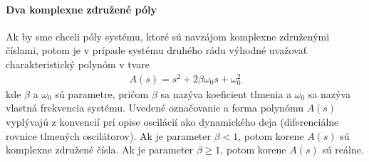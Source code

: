 \documentclass[a4paper, 10pt, ]{article}
\begin{document}
\paragraph{Dva komplexne združené póly}

Ak by sme chceli póly systému, ktoré sú navzájom komplexne združenými číslami, potom je v prípade systému druhého rádu výhodné uvažovať charakteristický polynóm v tvare
\begin{align}
    A(s) = s^2 + 2 \beta \omega_0 s + \omega_0^2
\end{align}
kde $\beta$ a $\omega_0$ sú parametre, pričom $\beta$ sa nazýva koeficient tlmenia a $\omega_0$ sa nazýva vlastná frekvencia systému. Uvedené označovanie a forma polynómu $A(s)$ vyplývajú z konvencií pri opise oscilácií ako dynamického deja (diferenciálne rovnice tlmených oscilátorov). Ak je parameter $\beta < 1$, potom korene $A(s)$ sú komplexne združené čísla. Ak je parameter $\beta \geq 1$, potom korene $A(s)$ sú reálne.
\end{document}
